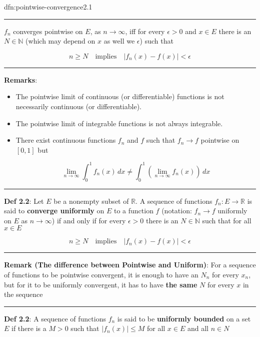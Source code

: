 \documentclass[landscape, 8pt]{extarticle}
\begin{document}
\begin{multicols}{3}
\begin{dfn}{dfn:pointwise-convergence}{2.1}
	\noindent\rule{\textwidth}{0.2pt}
	$f_{n}$ converges pointwise on $E$, as $n\to\infty$, iff for every $\epsilon>0$ and $x \in E$ there is an $N \in\mathbb{N}$ (which may depend on $x$ as well we $\epsilon$) such that

	\vspace{-8pt}
	\[n\ge N\quad\text{implies}\quad \lvert f_{n}(x)-f(x) \rvert < \epsilon\]

	\vspace{-5pt}
	\noindent\rule{\textwidth}{0.2pt}
	\textbf{Remarks}:
	\begin{itemize}[leftmargin=*]
		\setlength\itemsep{0em}
		\item The pointwise limit of continuous (or differentiable) functions is not necessarily continuous (or differentiable).

		\item The pointwise limit of integrable functions is not always integrable.

		\item There exist continuous functions $f_{n}$ and $f$ such that $f_{n}\to f$ pointwise on $[0,1]$ but

			\vspace{-5pt}
			\[\lim_{n \to \infty} \int_{0}^{1} f_{n}(x) \, dx \ne \int_{0}^{1} \left(\lim_{n \to \infty} f_{n}(x)\right) \, dx \]
	\end{itemize}

	\noindent\rule{\textwidth}{0.6pt}

	\textbf{Def 2.2}: Let $E$ be a nonempty subset of $\mathbb{R}$. A sequence of functions $f_{n}: E\to\mathbb{R}$ is said to \textbf{converge uniformly} on $E$ to a function $f$ (notation: $f_{n}\to f$ uniformly on $E$ as $n\to\infty$) if and only if for every $\epsilon>0$ there is an $N \in\mathbb{N}$ such that for all $x \in E$

	\vspace{-5pt}
	\[n\ge N\quad\text{implies}\quad \lvert f_{n}(x)-f(x) \rvert <\epsilon\]

	\vspace{-5pt}
	\noindent\rule{\textwidth}{0.2pt}
	\textbf{Remark (The difference between Pointwise and Uniform)}: For a sequence of functions to be pointwise convergent, it is enough to have an $N_{n}$ for every $x_{n}$, but for it to be uniformly convergent, it has to have \textbf{the same} $N$ for every $x$ in the sequence

	\noindent\rule{\textwidth}{0.2pt}

	\textbf{Def 2.2}: A sequence of functions $f_{n}$ is said to be \textbf{uniformly bounded} on a set $E$ if there is a $M>0$ such that $\lvert f_{n}(x) \rvert\le M$ for all $x\in E$ and all $n\in N$
\end{dfn}


\end{multicols}
\end{document}
